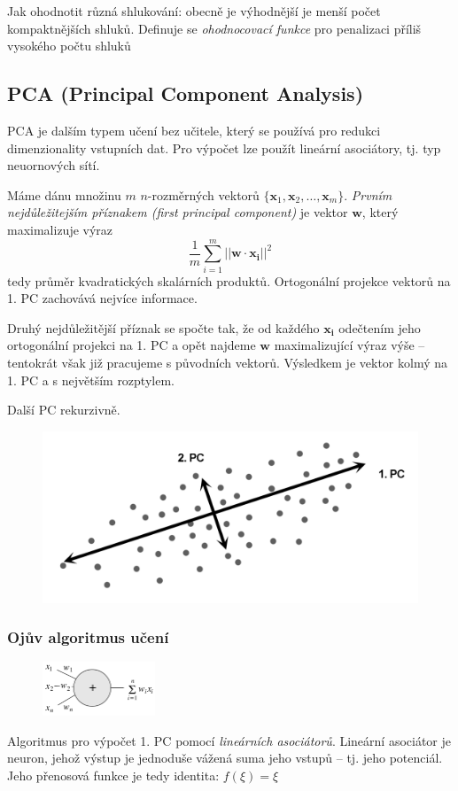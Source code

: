 \documentclass[11pt]{report} %
\renewcommand{\vec}[1]{\mathbf{#1}}
\numberwithin{equation}{section}
\begin{document}
Jak ohodnotit různá shlukování: obecně je výhodnější je menší počet kompaktnějších shluků. Definuje se \textit{ohodnocovací funkce} pro penalizaci příliš vysokého počtu shluků



\subsection{PCA (Principal Component Analysis)}
PCA je dalším typem učení bez učitele, který se používá pro redukci dimenzionality vstupních dat. Pro výpočet lze použít lineární asociátory, tj. typ neuornových sítí.

Máme dánu množinu $m$ $n$-rozměrných vektorů $\{\vec{x}_1, \vec{x}_2, \dots, \vec{x}_m\}$. \textit{Prvním nejdůležitejším příznakem (first principal component)} je vektor $\vec{w}$, který maximalizuje výraz
$$\frac{1}{m}\sum_{i=1}^{m}||\vec{w}\cdot\vec{x_i}||^2$$
tedy průměr kvadratických skalárních produktů. Ortogonální projekce vektorů na 1. PC zachovává nejvíce informace.

Druhý nejdůležitější příznak se spočte tak, že od každého $\vec{x_i}$ odečtením jeho ortogonální projekci na 1. PC a opět najdeme $\vec{w}$ maximalizující výraz výše -- tentokrát však již pracujeme s  původních vektorů. Výsledkem je vektor kolmý na 1. PC a s největším rozptylem. 

Další PC rekurzivně.

\begin{figure}[h]
	\centering
	\includegraphics[]{img/pca.png}
\end{figure}

\subsubsection{Ojův algoritmus učení}
\begin{figure}
	\centering
	\includegraphics[width=0.3\textwidth]{img/lin_asoc.png}
\end{figure}
Algoritmus pro výpočet 1. PC pomocí \textit{lineárních asociátorů}. Lineární asociátor je neuron, jehož výstup je jednoduše vážená suma jeho vstupů -- tj. jeho potenciál. Jeho přenosová funkce je tedy identita: $f(\xi) = \xi$
\end{document}
